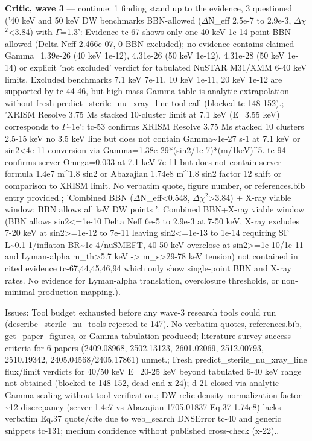 \documentclass[11pt,a4paper]{article}
\begin{document}
\textbf{Critic, wave 3} --- continue: 1 finding stand up to the evidence, 3 questioned ('40 keV and 50 keV DW benchmarks BBN-allowed ($\Delta$N\_eff 2.5e-7 to 2.9e-3, $\Delta$$\chi$$^2$\textless{}3.84) with $\Gamma$=1.3': Evidence tc-67 shows only one 40 keV 1e-14 point BBN-allowed (Delta Neff 2.466e-07, 0 BBN-excluded); no evidence contains claimed Gamma=1.39e-26 (40 keV 1e-12), 4.31e-26 (50 keV 1e-12), 4.31e-28 (50 keV 1e-14) or explicit 'not excluded' verdict for tabulated NuSTAR M31/XMM 6-40 keV limits. Excluded benchmarks 7.1 keV 7e-11, 10 keV 1e-11, 20 keV 1e-12 are supported by tc-44-46, but high-mass Gamma table is analytic extrapolation without fresh predict\_sterile\_nu\_xray\_line tool call (blocked tc-148-152).; 'XRISM Resolve 3.75 Ms stacked 10-cluster limit at 7.1 keV (E=3.55 keV) corresponds to $\Gamma$\textasciitilde{}1e': tc-53 confirms XRISM Resolve 3.75 Ms stacked 10 clusters 2.5-15 keV no 3.5 keV line but does not contain Gamma\textasciitilde{}1e-27 s-1 at 7.1 keV or sin2\textless{}4e-11 conversion via Gamma=1.38e-29*(sin2/1e-7)*(m/1keV)\textasciicircum{}5. tc-94 confirms server Omega=0.033 at 7.1 keV 7e-11 but does not contain server formula 1.4e7 m\textasciicircum{}1.8 sin2 or Abazajian 1.74e8 m\textasciicircum{}1.8 sin2 factor 12 shift or comparison to XRISM limit. No verbatim quote, figure number, or references.bib entry provided.; 'Combined BBN ($\Delta$N\_eff\textless{}0.548, $\Delta$$\chi$$^2$\textgreater{}3.84) + X-ray viable window: BBN allows all keV DW points ': Combined BBN+X-ray viable window (BBN allows sin2\textless{}=1e-10 Delta Neff 6e-5 to 2.9e-3 at 7-50 keV, X-ray excludes 7-20 keV at sin2\textgreater{}=1e-12 to 7e-11 leaving sin2\textless{}=1e-13 to 1e-14 requiring SF L\textasciitilde{}0.1-1/inflaton BR\textasciitilde{}1e-4/nuSMEFT, 40-50 keV overclose at sin2\textgreater{}=1e-10/1e-11 and Lyman-alpha m\_th\textgreater{}5.7 keV -\textgreater{} m\_s\textgreater{}29-78 keV tension) not contained in cited evidence tc-67,44,45,46,94 which only show single-point BBN and X-ray rates. No evidence for Lyman-alpha translation, overclosure thresholds, or non-minimal production mapping.).

Issues: Tool budget exhausted before any wave-3 research tools could run (describe\_sterile\_nu\_tools rejected tc-147). No verbatim quotes, references.bib, get\_paper\_figures, or Gamma tabulation produced; literature survey success criteria for 6 papers (2409.08968, 2502.13123, 2601.02069, 2512.00793, 2510.19342, 2405.04568/2405.17861) unmet.; Fresh predict\_sterile\_nu\_xray\_line flux/limit verdicts for 40/50 keV E=20-25 keV beyond tabulated 6-40 keV range not obtained (blocked tc-148-152, dead end x-24); d-21 closed via analytic Gamma scaling without tool verification.; DW relic-density normalization factor \textasciitilde{}12 discrepancy (server 1.4e7 vs Abazajian 1705.01837 Eq.37 1.74e8) lacks verbatim Eq.37 quote/cite due to web\_search DNSError tc-40 and generic snippets tc-131; medium confidence without published cross-check (x-22)..
\end{document}
